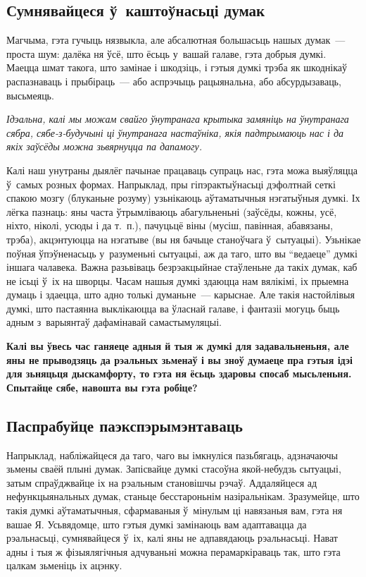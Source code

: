\subsection*{Сумнявайцеся ў~каштоўнасьці думак}

Магчыма, гэта гучыць нязвыкла, але абсалютная большасьць нашых думак~--- проста шум: далёка ня ўсё, што ёсьць у~вашай галаве, гэта добрыя думкі. Маецца шмат такога, што замінае і шкодзіць, і гэтыя думкі трэба як шкоднікаў распазнаваць і прыбіраць~--- або аспрэчыць рацыянальна, або абсурдызаваць, высьмеяць.

\emph{Ідэальна, калі мы можам свайго ўнутранага крытыка замяніць на ўнутранага сябра, сябе-з-будучыні ці ўнутранага настаўніка, якія падтрымаюць нас і да якіх заўсёды можна зьвярнуцца па дапамогу.}

Калі наш унутраны дыялёг пачынае працаваць супраць нас, гэта можа выяўляцца ў~самых розных формах. Напрыклад, пры гіпэрактыўнасьці дэфолтнай сеткі спакою мозгу (блуканьне розуму) узьнікаюць аўтаматычныя нэгатыўныя думкі. Іх лёгка пазнаць: яны часта ўтрымліваюць абагульненьні (заўсёды, кожны, усё, ніхто, ніколі, усюды і да т.~п.), пачуцьцё віны (мусіш, павінная, абавязаны, трэба), акцэнтуюцца на нэгатыве (вы ня бачыце станоўчага ў~сытуацыі). Узьнікае поўная ўпэўненасьць у~разуменьні сытуацыі, аж да таго, што вы ``ведаеце'' думкі іншага чалавека. Важна разьвіваць безрэакцыйнае стаўленьне да такіх думак, каб не ісьці ў~іх на шворцы. Часам нашыя думкі здаюцца нам вялікімі, іх прыемна думаць і здаецца, што адно толькі думаньне~--- карыснае. Але такія настойлівыя думкі, што пастаянна выклікаюцца ва ўласнай галаве, і фантазіі могуць быць адным з~варыянтаў дафамінавай самастымуляцыі. 

\textbf{Калі вы ўвесь час ганяеце адныя й тыя ж думкі для задавальненьня, але яны не прыводзяць да рэальных зьменаў і вы зноў думаеце пра гэтыя ідэі для зьняцьця дыскамфорту, то гэта ня ёсьць здаровы спосаб мысьленьня. Спытайце сябе, навошта вы гэта робіце?}

\subsection*{Паспрабуйце паэкспэрымэнтаваць}

Напрыклад, набліжайцеся да таго, чаго вы імкнуліся пазьбягаць, адзначаючы зьмены сваёй плыні думак. Запісвайце думкі стасоўна якой-небудзь сытуацыі, затым спраўджвайце іх на рэальным становішчы рэчаў. Аддаляйцеся ад нефункцыянальных думак, станьце бесстароньнім назіральнікам. Зразумейце, што такія думкі аўтаматычныя, сфармаваныя ў~мінулым ці навязаныя вам, гэта ня вашае Я. Усьвядомце, што гэтыя думкі замінаюць вам адаптавацца да рэальнасьці, сумнявайцеся ў~іх, калі яны не адпавядаюць рэальнасьці. Нават адны і тыя ж фізыялягічныя адчуваньні можна перамаркіраваць так, што гэта цалкам зьменіць іх ацэнку.

